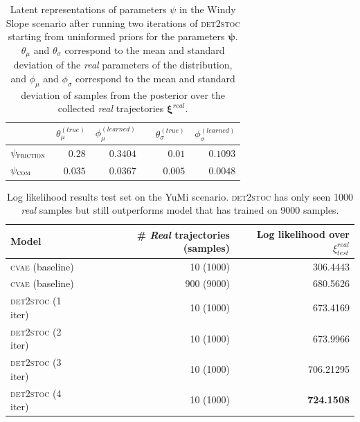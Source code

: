 \documentclass{kththesis}
\renewcommand{\vec}[1]{\boldsymbol{#1}}
\newcommand{\cvae}{\textsc{cvae}}
\newcommand{\dettostoc}{\textsc{det2stoc}}
\newcommand{\ra}[1]{\renewcommand{\arraystretch}{#1}}
\newcommand{\pfriction}{\psi_{\textsc{friction}}}
\newcommand{\pcom}{\psi_{\textsc{com}}}
\newcommand{\trajreal}{\xi^{real}}
\begin{document}
\begin{table}
\ra{1.3}
\centering
\begin{tabular}{lrrcrr}
\toprule
& $\theta_\mu^{(true)}$ & $\phi_\mu^{(learned)}$ && $\theta_\sigma^{(true)}$ & $\phi_\sigma^{(learned)}$ \\
\midrule
$\pfriction$ & $0.28$ & $0.3404$ && $0.01$ & $0.1093$ \\
$\pcom$ & $0.035$ & $ 0.0367$ && $0.005$ & $0.0048$ \\
\bottomrule
\end{tabular}
\caption{Latent representations of parameters $\psi$ in the Windy Slope scenario after running two iterations of \dettostoc{} starting from uninformed priors for the parameters $\vec{\psi}$. $\theta_\mu$ and $\theta_\sigma$ correspond to the mean and standard deviation of the \emph{real} parameters of the distribution, and $\phi_\mu$ and $\phi_\sigma$ correspond to the mean and standard deviation of samples from the posterior over the collected \emph{real} trajectories $\vec{\xi}^{real}$.}
\label{fig_3_parameters_table}
\end{table}


\begin{table}
\ra{1.3}
\centering
\begin{tabular}{lrr}
\toprule
Model & \# \emph{Real} trajectories (samples) & Log likelihood over $\trajreal_{test}$ \\
\midrule
\cvae{} (baseline) & 10 (1000) & 306.4443\\
\cvae{} (baseline) & 900 (9000) & 680.5626 \\
\dettostoc{} (1 iter) & 10 (1000) & 673.4169\\
\dettostoc{} (2 iter) & 10 (1000) & 673.9966\\
\dettostoc{} (3 iter) & 10 (1000) & 706.21295\\
\dettostoc{} (4 iter) & 10 (1000) & \textbf{724.1508}\\

\bottomrule
\end{tabular}
\caption{Log likelihood results test set on the YuMi scenario. \dettostoc{} has only seen 1000 \emph{real} samples but still outperforms model that has trained on 9000 samples.}
\label{fig:windyslope_logprob}
\end{table}
\end{document}
